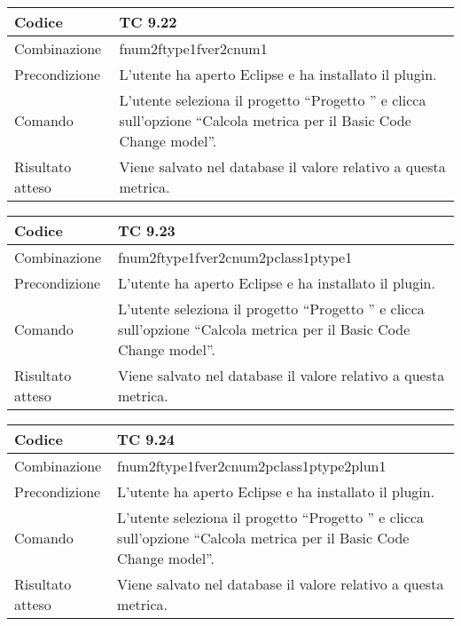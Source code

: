 \clearpage

\begin{table}[ht]
\begin{tabular}{|p{3cm}|p{9cm}|}
\hline
\cellcolor{lightgray}Codice				& TC 9.22								\\
\hline
\cellcolor{lightgray}Combinazione		& fnum2ftype1fver2cnum1									\\
\hline
\cellcolor{lightgray}Precondizione		& L'utente ha aperto Eclipse e ha installato il plugin.		\\
\hline
\cellcolor{lightgray}Comando			& L'utente seleziona il progetto ``Progetto ''  e clicca sull'opzione ``Calcola metrica per il Basic Code Change model''.	\\
\hline
\cellcolor{lightgray}Risultato atteso	& Viene salvato nel database il valore relativo a questa metrica.\\
\hline
\end{tabular}
\end{table}


\begin{table}[ht]
\begin{tabular}{|p{3cm}|p{9cm}|}
\hline
\cellcolor{lightgray}Codice				& TC 9.23								\\
\hline
\cellcolor{lightgray}Combinazione		& fnum2ftype1fver2cnum2pclass1ptype1									\\
\hline
\cellcolor{lightgray}Precondizione		& L'utente ha aperto Eclipse e ha installato il plugin.		\\
\hline
\cellcolor{lightgray}Comando			& L'utente seleziona il progetto ``Progetto ''  e clicca sull'opzione ``Calcola metrica per il Basic Code Change model''.	\\
\hline
\cellcolor{lightgray}Risultato atteso	& Viene salvato nel database il valore relativo a questa metrica.\\
\hline
\end{tabular}
\end{table}


\begin{table}[ht]
\begin{tabular}{|p{3cm}|p{9cm}|}
\hline
\cellcolor{lightgray}Codice				& TC 9.24								\\
\hline
\cellcolor{lightgray}Combinazione		& fnum2ftype1fver2cnum2pclass1ptype2plun1									\\
\hline
\cellcolor{lightgray}Precondizione		& L'utente ha aperto Eclipse e ha installato il plugin.		\\
\hline
\cellcolor{lightgray}Comando			& L'utente seleziona il progetto ``Progetto ''  e clicca sull'opzione ``Calcola metrica per il Basic Code Change model''.	\\
\hline
\cellcolor{lightgray}Risultato atteso	& Viene salvato nel database il valore relativo a questa metrica.\\
\hline
\end{tabular}
\end{table}


